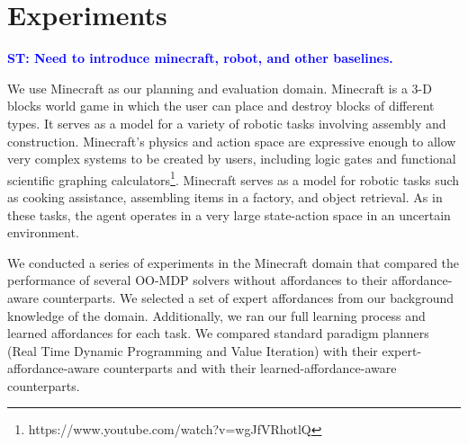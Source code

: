\documentclass[conference]{IEEEtran}
\newcommand{\stnote}[1]{\textcolor{Blue}{\textbf{ST: #1}}}
\begin{document}

\section{Experiments}
\label{sec:experiments}

\stnote{Need to introduce minecraft, robot, and other baselines.}

We use Minecraft as our planning and evaluation domain. Minecraft is a
 3-D blocks world game in which the user can place and destroy blocks
 of different types. It serves as a model for a variety of robotic tasks involving 
 assembly and construction.  Minecraft's physics and action space are expressive
 enough to allow very complex systems to be created by users, including logic gates and 
 functional scientific graphing calculators\footnote{https://www.youtube.com/watch?v=wgJfVRhotlQ}.
 Minecraft serves as a model for robotic tasks such as cooking assistance, assembling items in a factory, 
 and object retrieval.  As in these tasks, the agent operates in a very large state-action space in an uncertain environment.

We conducted a series of experiments in the Minecraft domain that
compared the performance of several OO-MDP solvers without affordances
to their affordance-aware counterparts. We selected a set of expert
affordances from our background knowledge of the domain. Additionally, we ran our full
learning process and learned affordances for each
task. We compared standard paradigm planners (Real Time Dynamic
Programming and Value Iteration) with their expert-affordance-aware
counterparts and with their learned-affordance-aware counterparts.
\end{document}
